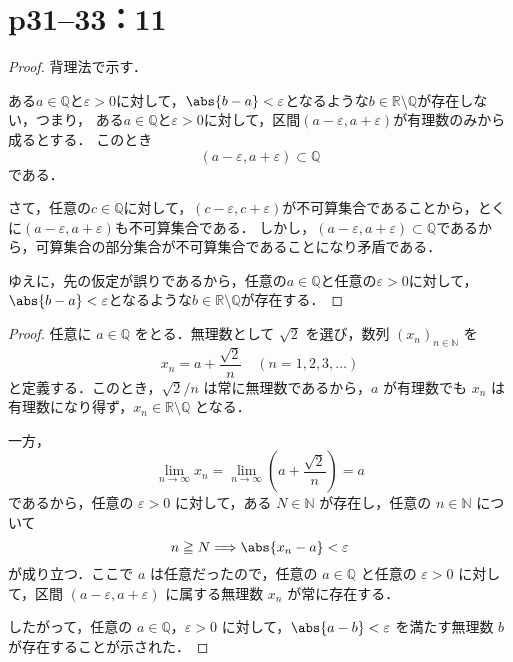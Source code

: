 \section*{p31--33：11}


\begin{leftbar}
    \begin{proof}
        背理法で示す．

        ある$ a\in \mathbb{Q}$と$\varepsilon >0$に対して，$\abs{b-a}<\varepsilon$となるような$b \in \mathbb{R} \setminus \mathbb{Q}$が存在しない，つまり，
        ある$a \in \mathbb{Q}$と$\varepsilon >0$に対して，区間$(a-\varepsilon , a+ \varepsilon)$が有理数のみから成るとする．
        このとき
        \[
            (a-\varepsilon , a+ \varepsilon) \subset \mathbb{Q}
        \]
        である．

        さて，任意の$ c \in \mathbb{Q}$に対して，$ (c-\varepsilon , c+ \varepsilon)$が不可算集合であることから，とくに$(a-\varepsilon , a+ \varepsilon)$も不可算集合である．
        しかし，$(a-\varepsilon , a+ \varepsilon) \subset \mathbb{Q}$であるから，可算集合の部分集合が不可算集合であることになり矛盾である．

        ゆえに，先の仮定が誤りであるから，任意の$ a\in \mathbb{Q}$と任意の$\varepsilon >0$に対して，$\abs{b-a}<\varepsilon$となるような$b \in \mathbb{R} \setminus \mathbb{Q}$が存在する．
    \end{proof}
\end{leftbar}


\begin{leftbar}
    [別解1]
    \begin{proof}
        任意に $a \in \mathbb{Q}$ をとる．無理数として $\sqrt{2}$ を選び，数列 $(x_n)_{n \in \mathbb{N}}$ を
        \[
            x_n = a + \frac{\sqrt{2}}{n}\quad (n=1,2,3,\dots)
        \]
        と定義する．このとき，$\sqrt{2}/n$ は常に無理数であるから，$a$ が有理数でも $x_n$ は有理数になり得ず，$x_n \in \mathbb{R}\setminus\mathbb{Q}$ となる．

        一方，
        \[
            \lim_{n \to \infty} x_n=\lim_{n \to \infty} \left(a + \frac{\sqrt{2}}{n}\right)=a
        \]
        であるから，任意の $\varepsilon > 0$ に対して，ある $N \in \mathbb{N}$ が存在し，任意の $n \in \mathbb{N}$ について
        \[
            n \geqq N \Longrightarrow \abs{x_n - a} < \varepsilon
        \]
        が成り立つ．ここで $a$ は任意だったので，任意の $a \in \mathbb{Q}$ と任意の $\varepsilon > 0$ に対して，区間 $(a-\varepsilon, a+\varepsilon)$ に属する無理数 $x_n$ が常に存在する．

        したがって，任意の $a \in \mathbb{Q}$，$\varepsilon > 0$ に対して，$\abs{a-b}<\varepsilon$ を満たす無理数 $b$ が存在することが示された．
    \end{proof}
\end{leftbar}


